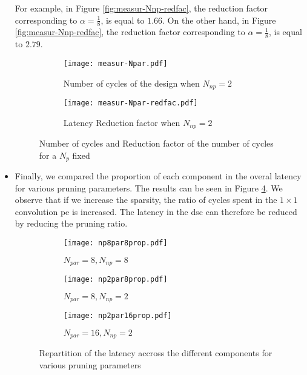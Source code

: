 \begin{itemize}
    For example, in Figure \ref{fig:measur-Nnp-redfac}, the reduction factor corresponding to $\alpha = \frac{1}{8}$, is equal to $1.66$. On the other hand,
    in Figure \ref{fig:measur-Nnp-redfac}, the reduction factor corresponding to $\alpha = \frac{1}{8}$, is equal to $2.79$.
    \begin{figure}
        \centering
        \begin{subfigure}[t]{.49\textwidth}
            \centering
            \texttt{[image: measur-Npar.pdf]}
            \caption{Number of cycles of the design when $N_{np} = 2$}
            \label{fig:measur-Npar}
        \end{subfigure}
        \begin{subfigure}[t]{.49\textwidth}
            \centering
            \texttt{[image: measur-Npar-redfac.pdf]}
            \caption{Latency Reduction factor when $N_{np} = 2$}
            \label{fig:measur-Npar-redfac}
        \end{subfigure}
        \caption{Number of cycles and Reduction factor of the number of cycles for a $N_{p}$ fixed}
    \end{figure}
    \item Finally, we compared the proportion of each component in the overal latency for various pruning parameters. The results can be seen in Figure \ref{fig:ratio-pr}. We observe that if we increase the sparsity, the ratio of cycles spent in the $1 \times 1$ convolution \acrshort{pe} is increased. The latency in the \acrshort{dsc} can therefore be reduced by reducing the pruning ratio.
    \begin{figure}
        \centering
        \begin{subfigure}[t]{.32\textwidth}
            \centering
            \texttt{[image: np8par8prop.pdf]}
            \caption{$N_{par} = 8, N_{np} = 8$}
        \end{subfigure}
        \begin{subfigure}[t]{.32\textwidth}
            \centering
            \texttt{[image: np2par8prop.pdf]}
            \caption{$N_{par} = 8, N_{np} = 2$}
        \end{subfigure}
        \begin{subfigure}[t]{.32\textwidth}
            \centering
            \texttt{[image: np2par16prop.pdf]}
            \caption{$N_{par} = 16, N_{np} = 2$}
        \end{subfigure}
        \caption{Repartition of the latency accross the different components for various pruning parameters}
        \label{fig:ratio-pr}
    \end{figure}
\end{itemize}
%
